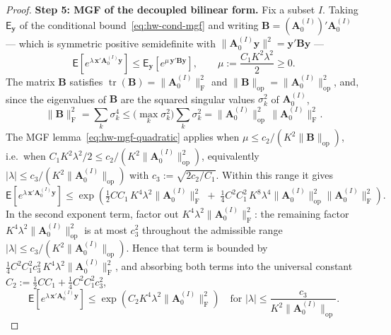 \documentclass[14pt]{extarticle}
\theoremstyle{plain}
\theoremstyle{definition}
\theoremstyle{remark}
\newcommand\expc{\mathsf{E}}
\DeclareMathOperator\tr{tr}
\newcommand{\by}{\mathbf{y}}
\newcommand{\bx}{\mathbf{x}}
\newcommand{\bA}{\mathbf{A}}
\newcommand{\bB}{\mathbf{B}}
\newcommand{\opnorm}[1]{\|#1\|_{\mathrm{op}}}
\newcommand{\fnorm}[1]{\|#1\|_{\mathrm{F}}}
\begin{document}
\begin{proof}
\textbf{Step 5: MGF of the decoupled bilinear form.} Fix a subset $I$. Taking $\expc_\by$ of the conditional bound~\eqref{eq:hw-cond-mgf} and writing $\bB = (\bA_0^{(I)})'\bA_0^{(I)}$ --- which is symmetric positive semidefinite with $\|\bA_0^{(I)}\by\|^2 = \by'\bB\by$ ---
\[
\expc\!\left[e^{\lambda\,\bx'\bA_0^{(I)}\by}\right] \leqslant \expc_\by\!\left[e^{\mu\,\by'\bB\by}\right], \qquad \mu := \frac{C_1 K^2\lambda^2}{2} \geqslant 0.
\]
The matrix $\bB$ satisfies $\tr(\bB) = \fnorm{\bA_0^{(I)}}^2$ and $\opnorm{\bB} = \opnorm{\bA_0^{(I)}}^2$, and, since the eigenvalues of $\bB$ are the squared singular values $\sigma_k^2$ of $\bA_0^{(I)}$,
\[
\fnorm{\bB}^2 = \sum_k \sigma_k^4 \leqslant \Big(\max_k \sigma_k^2\Big)\sum_k \sigma_k^2 = \opnorm{\bA_0^{(I)}}^2\,\fnorm{\bA_0^{(I)}}^2.
\]
The MGF lemma~\eqref{eq:hw-mgf-quadratic} applies when $\mu \leqslant c_2/(K^2\opnorm{\bB})$, i.e.\ when $C_1 K^2\lambda^2/2 \leqslant c_2/(K^2\opnorm{\bA_0^{(I)}}^2)$, equivalently $|\lambda| \leqslant c_3/(K^2\opnorm{\bA_0^{(I)}})$ with $c_3 := \sqrt{2c_2/C_1}$. Within this range it gives
\[
\expc\!\left[e^{\lambda\,\bx'\bA_0^{(I)}\by}\right] \leqslant \exp\!\left(\tfrac{1}{2}C C_1\, K^4\lambda^2\fnorm{\bA_0^{(I)}}^2 \;+\; \tfrac{1}{4}C^2 C_1^2\, K^8\lambda^4\opnorm{\bA_0^{(I)}}^2\fnorm{\bA_0^{(I)}}^2\right).
\]
In the second exponent term, factor out $K^4\lambda^2\fnorm{\bA_0^{(I)}}^2$: the remaining factor $K^4\lambda^2\opnorm{\bA_0^{(I)}}^2$ is at most $c_3^2$ throughout the admissible range $|\lambda| \leqslant c_3/(K^2\opnorm{\bA_0^{(I)}})$. Hence that term is bounded by $\tfrac{1}{4}C^2 C_1^2 c_3^2\, K^4\lambda^2\fnorm{\bA_0^{(I)}}^2$, and absorbing both terms into the universal constant $C_2 := \tfrac{1}{2}C C_1 + \tfrac{1}{4}C^2 C_1^2 c_3^2$,
\begin{equation}\label{eq:hw-bilinear-mgf}
\expc\!\left[e^{\lambda\,\bx'\bA_0^{(I)}\by}\right] \leqslant \exp\!\left(C_2 K^4\lambda^2\fnorm{\bA_0^{(I)}}^2\right) \quad \text{for } |\lambda| \leqslant \frac{c_3}{K^2\opnorm{\bA_0^{(I)}}}.
\end{equation}


\end{proof}
\end{document}
